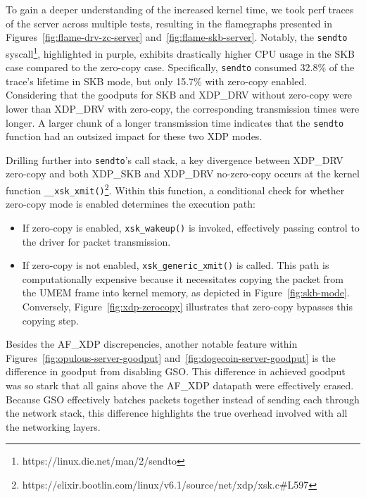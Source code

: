 To gain a deeper understanding of the increased kernel time, we took perf traces of the server across multiple tests, resulting in the flamegraphs presented in Figures~\ref{fig:flame-drv-zc-server} and~\ref{fig:flame-skb-server}. Notably, the \texttt{sendto} syscall\footnote{https://linux.die.net/man/2/sendto}, highlighted in purple, exhibits drastically higher CPU usage in the SKB case compared to the zero-copy case. Specifically, \texttt{sendto} consumed 32.8\% of the trace's lifetime in SKB mode, but only 15.7\% with zero-copy enabled. Considering that the goodputs for SKB and XDP\_DRV without zero-copy were lower than XDP\_DRV with zero-copy, the corresponding transmission times were longer. A larger chunk of a longer transmission time indicates that the \texttt{sendto} function had an outsized impact for these two \ac{XDP} modes.

Drilling further into \texttt{sendto}'s call stack, a key divergence between XDP\_DRV zero-copy and both XDP\_SKB and XDP\_DRV no-zero-copy occurs at the kernel function \texttt{\_\_xsk\_xmit()}\footnote{https://elixir.bootlin.com/linux/v6.1/source/net/xdp/xsk.c\#L597}. Within this function, a conditional check for whether zero-copy mode is enabled determines the execution path:

\begin{itemize}
    \item If zero-copy is enabled, \texttt{xsk\_wakeup()} is invoked, effectively passing control to the driver for packet transmission.
    \item If zero-copy is not enabled, \texttt{xsk\_generic\_xmit()} is called. This path is computationally expensive because it necessitates copying the packet from the UMEM frame into kernel memory, as depicted in Figure~\ref{fig:skb-mode}. Conversely, Figure~\ref{fig:xdp-zerocopy} illustrates that zero-copy bypasses this copying step.
\end{itemize}


Besides the AF\_XDP discrepencies, another notable feature within Figures~\ref{fig:opulous-server-goodput} and~\ref{fig:dogecoin-server-goodput} is the difference in goodput from disabling \ac{GSO}. This difference in achieved goodput was so stark that all gains above the AF\_XDP datapath were effectively erased. Because \ac{GSO} effectively batches packets together instead of sending each through the network stack, this difference highlights the true overhead involved with all the networking layers.

